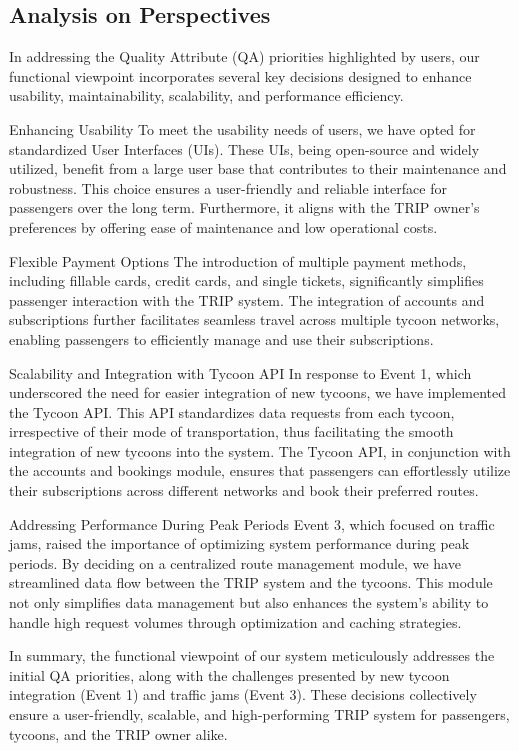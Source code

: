 \subsection{Analysis on Perspectives}
In addressing the Quality Attribute (QA) priorities highlighted by users, our functional viewpoint incorporates several key decisions designed to enhance usability, maintainability, scalability, and performance efficiency.

Enhancing Usability
To meet the usability needs of users, we have opted for standardized User Interfaces (UIs). These UIs, being open-source and widely utilized, benefit from a large user base that contributes to their maintenance and robustness. This choice ensures a user-friendly and reliable interface for passengers over the long term. Furthermore, it aligns with the TRIP owner's preferences by offering ease of maintenance and low operational costs.

Flexible Payment Options
The introduction of multiple payment methods, including fillable cards, credit cards, and single tickets, significantly simplifies passenger interaction with the TRIP system. The integration of accounts and subscriptions further facilitates seamless travel across multiple tycoon networks, enabling passengers to efficiently manage and use their subscriptions.

Scalability and Integration with Tycoon API
In response to Event 1, which underscored the need for easier integration of new tycoons, we have implemented the Tycoon API. This API standardizes data requests from each tycoon, irrespective of their mode of transportation, thus facilitating the smooth integration of new tycoons into the system. The Tycoon API, in conjunction with the accounts and bookings module, ensures that passengers can effortlessly utilize their subscriptions across different networks and book their preferred routes.

Addressing Performance During Peak Periods
Event 3, which focused on traffic jams, raised the importance of optimizing system performance during peak periods. By deciding on a centralized route management module, we have streamlined data flow between the TRIP system and the tycoons. This module not only simplifies data management but also enhances the system's ability to handle high request volumes through optimization and caching strategies.

In summary, the functional viewpoint of our system meticulously addresses the initial QA priorities, along with the challenges presented by new tycoon integration (Event 1) and traffic jams (Event 3). These decisions collectively ensure a user-friendly, scalable, and high-performing TRIP system for passengers, tycoons, and the TRIP owner alike.



